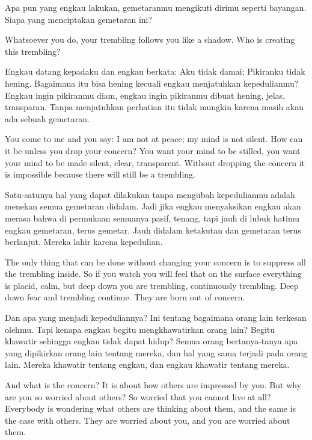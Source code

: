 \bahasa
Apa pun yang engkau lakukan, gemetaranmu mengikuti dirimu seperti bayangan. Siapa yang menciptakan gemetaran ini?

\english
Whatsoever you do, your trembling follows you like a shadow. Who is creating this trembling?

\bahasa
Engkau datang kepadaku dan engkau berkata: Aku tidak damai; Pikiranku tidak hening. Bagaimana itu bisa hening kecuali engkau menjatuhkan kepedulianmu? Engkau ingin pikiranmu diam, engkau ingin pikiranmu dibuat hening, jelas, transparan. Tanpa menjatuhkan perhatian itu tidak mungkin karena masih akan ada sebuah gemetaran.

\english
You come to me and you say: I am not at peace; my mind is not silent. How can it be unless you drop your concern? You want your mind to be stilled, you want your mind to be made silent, clear, transparent. Without dropping the concern it is impossible because there will still be a trembling.

\bahasa
Satu-satunya hal yang dapat dilakukan tanpa mengubah kepedulianmu adalah menekan semua gemetaran didalam. Jadi jika engkau menyaksikan engkau akan merasa bahwa di permukaan semuanya pasif, tenang, tapi jauh di lubuk hatimu engkau gemetaran, terus gemetar. Jauh didalam ketakutan dan gemetaran terus berlanjut. Mereka lahir karena kepedulian.

\english
The only thing that can be done without changing your concern is to suppress all the trembling inside. So if you watch you will feel that on the surface everything is placid, calm, but deep down you are trembling, continuously trembling. Deep down fear and trembling continue. They are born out of concern.

\bahasa
Dan apa yang menjadi kepeduliannya? Ini tentang bagaimana orang lain terkesan olehmu. Tapi kenapa engkau begitu mengkhawatirkan orang lain? Begitu khawatir sehingga engkau tidak dapat hidup? Semua orang bertanya-tanya apa yang dipikirkan orang lain tentang mereka, dan hal yang sama terjadi pada orang lain. Mereka khawatir tentang engkau, dan engkau khawatir tentang mereka.

\english
And what is the concern? It is about how others are impressed by you. But why are you so worried about others? So worried that you cannot live at all? Everybody is wondering what others are thinking about them, and the same is the case with others. They are worried about you, and you are worried about them.

